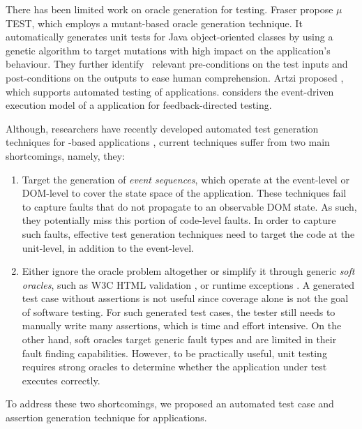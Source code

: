 There has been limited work on oracle generation for testing. 
Fraser \etal \cite{fraser:tse12} propose $\mu$TE\-ST, which employs a mutant-based oracle generation technique.  It automatically generates unit tests for Java object-oriented classes by using a genetic algorithm to target mutations with high impact on the application's behaviour. They further identify~\cite{fraser:issta11} relevant pre-conditions on the test inputs and post-conditions on the outputs to ease human comprehension.
Artzi \etal proposed \artemis \cite{artzi:icse11}, which supports automated testing of \javascript applications.
\artemis considers the event-driven execution model of a \javascript application for feedback-directed testing. 

 Although, researchers have recently developed automated test generation techniques for \javascript-based applications \cite{artzi:icse11, marchetto:search, tonella:icst08, mesbah:tse12, song:symb10}, current techniques suffer from two main shortcomings, namely, they:
\begin{enumerate} 
\item Target the generation of \emph{event sequences}, which operate at the event-level or DOM-level to cover the state space of the application. These techniques fail to capture faults that  do not propagate to an observable DOM state. As such, they potentially miss this portion of code-level \javascript faults. In order to capture such faults, effective test generation techniques need to target the code at the \javascript unit-level, in addition to the event-level.
\item Either ignore the oracle problem altogether or simplify it through generic \emph{soft oracles}, such as  W3C HTML  validation \cite{artzi:icse11,mesbah:tse12}, or  \javascript runtime exceptions \cite{artzi:icse11}.
A generated test case without assertions is not useful since coverage alone is not the goal of software testing. For such generated test cases, the tester still needs to  manually write many assertions, which is time and effort intensive. 
On the other hand, soft oracles  target generic fault types and are limited in their fault finding capabilities.   %
However, to be practically useful, unit testing requires strong oracles to determine whether the application under test executes correctly.
\end{enumerate}
To address these two shortcomings, we proposed an automated test case and assertion generation technique for \javascript applications.

